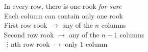 \documentclass[preview]{standalone}
\begin{document}
\begin{center}
In every row, there is one rook \textit{for sure} \\ Each column can contain only one rook \\ First row rook $\rightarrow$ any of the $n$ columns \\ Second row rook $\rightarrow$ any of the $n - 1$ columns \\ \vdots nth row rook $\rightarrow$ only $1$ column
\end{center}
\end{document}
